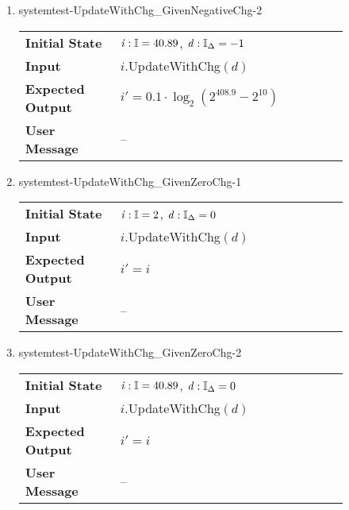 \begin{enumerate}
    \item{systemtest-UpdateWithChg\_GivenNegativeChg-2}
    \begin{table}[H]
        \centering
        \begin{tabular}{P{0.25\linewidth}P{0.6\linewidth}}
            \toprule
            \textbf{Initial State} & $ \mathit{i} : \mathbb{I} =
            40.89 $, $ \mathit{d} : \mathbb{I}_{\Delta} = -1 $ \\
            \textbf{Input} & $\mathit{i}.
            $UpdateWithChg$(\mathit{d}) $ \\ \midrule
            \textbf{Expected Output} & $ \mathit{i}' = 0.1 \cdot
            \log_2(2^{408.9} - 2^{10}) $ \\
            \textbf{User Message} & -- \\ \bottomrule
        \end{tabular}
    \end{table}

    \clearpage

    \item{systemtest-UpdateWithChg\_GivenZeroChg-1}
    \begin{table}[H]
        \centering
        \begin{tabular}{P{0.25\linewidth}P{0.6\linewidth}}
            \toprule
            \textbf{Initial State} & $ \mathit{i} : \mathbb{I} =
            2 $, $ \mathit{d} : \mathbb{I}_{\Delta} = 0 $ \\
            \textbf{Input} & $\mathit{i}.
            $UpdateWithChg$(\mathit{d}) $ \\ \midrule
            \textbf{Expected Output} & $ \mathit{i}' = \mathit{i} $ \\
            \textbf{User Message} & -- \\ \bottomrule
        \end{tabular}
    \end{table}

    \item{systemtest-UpdateWithChg\_GivenZeroChg-2}
    \begin{table}[H]
        \centering
        \begin{tabular}{P{0.25\linewidth}P{0.6\linewidth}}
            \toprule
            \textbf{Initial State} & $ \mathit{i} : \mathbb{I} =
            40.89 $, $ \mathit{d} : \mathbb{I}_{\Delta} = 0 $ \\
            \textbf{Input} & $\mathit{i}.
            $UpdateWithChg$(\mathit{d}) $ \\ \midrule
            \textbf{Expected Output} & $ \mathit{i}' = \mathit{i} $ \\
            \textbf{User Message} & -- \\ \bottomrule
        \end{tabular}
    \end{table}


\end{enumerate}
